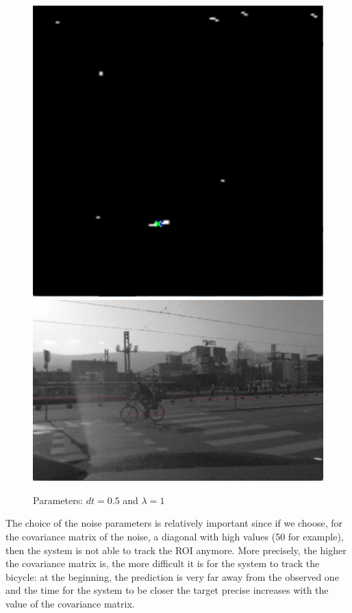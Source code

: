 \documentclass[a4paper,11pt]{article}
\begin{document}
\begin{figure}[H]
    \includegraphics[scale=0.3]{pic/tracking2.png}
    \includegraphics[scale=0.4]{pic/tracking2-left.png} \\
    \caption{Parameters: $ dt = 0.5 $ and $ \lambda = 1 $}
\end{figure}

The choice of the noise parameters is relatively important since if we choose,
for the covariance matrix of the noise, a diagonal with \og high \fg values (50
for example), then the system is not able to track the ROI anymore. More precisely,
the higher the covariance matrix is, the more difficult it is for the system to
track the bicycle: at the beginning, the prediction is very far away from the
observed one and the time for the system to be closer the target precise
increases with the value of the covariance matrix.
\end{document}
